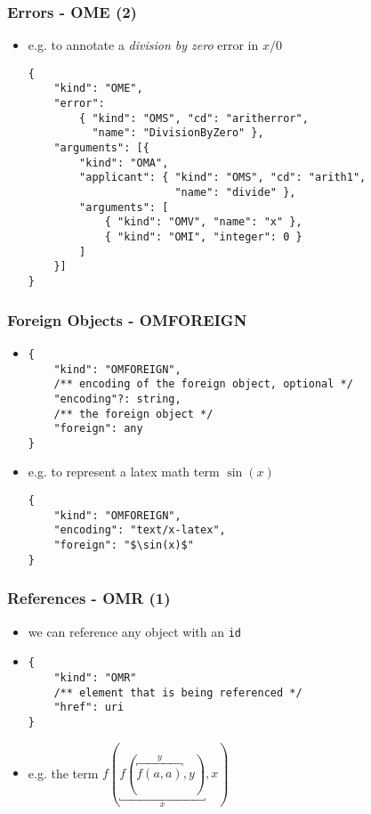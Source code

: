 \documentclass[usenames,dvipsnames]{beamer}
\begin{document}
\begin{frame}[fragile]
    \frametitle{Errors - OME (2)}
    \begin{itemize}
        \item e.g. to annotate a \textit{division by zero} error in $x / 0$
\begin{lstlisting}
{
    "kind": "OME",
    "error":
        { "kind": "OMS", "cd": "aritherror", 
          "name": "DivisionByZero" },
    "arguments": [{
        "kind": "OMA",
        "applicant": { "kind": "OMS", "cd": "arith1",
                       "name": "divide" },
        "arguments": [
            { "kind": "OMV", "name": "x" },
            { "kind": "OMI", "integer": 0 }
        ]
    }]
}
\end{lstlisting}
    \end{itemize}
\end{frame}

\begin{frame}[fragile]
    \frametitle{Foreign Objects - OMFOREIGN}
    \begin{itemize}
        \item
\begin{lstlisting}
{
    "kind": "OMFOREIGN",
    /** encoding of the foreign object, optional */
    "encoding"?: string,
    /** the foreign object */
    "foreign": any
}
\end{lstlisting}
        \item e.g. to represent a latex math term $\sin(x)$
\begin{lstlisting}
{
    "kind": "OMFOREIGN",
    "encoding": "text/x-latex",
    "foreign": "$\sin(x)$"
}
\end{lstlisting}
    \end{itemize}
\end{frame}


\begin{frame}[fragile]
    \frametitle{References - OMR (1)}
    \begin{itemize}
        \item we can reference any object with an \texttt{id}
        \item
\begin{lstlisting}
{
    "kind": "OMR"
    /** element that is being referenced */
    "href": uri
}
\end{lstlisting}
        \item e.g. the term $f(\underbracket {f(\overbracket {f(a, a)}^y, y)}_x, x)$
    \end{itemize}
\end{frame}
\end{document}
